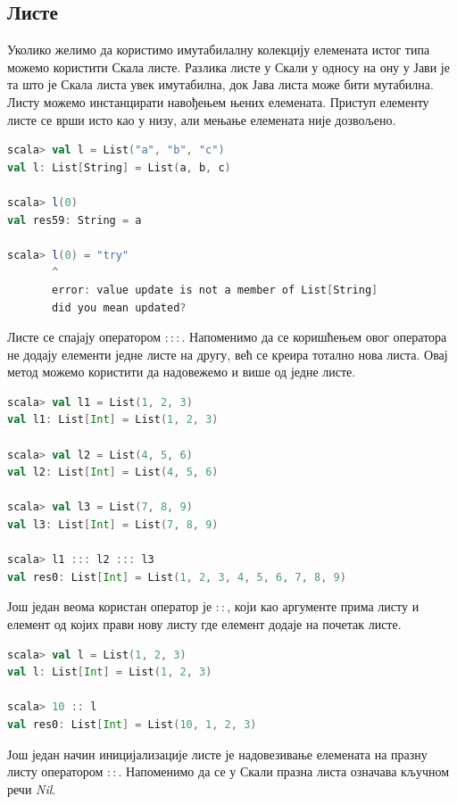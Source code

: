 \documentclass[12pt,oneside]{memoir}
\begin{document}
\subsection{Листе}
\label{subsec:scala_lists}

Уколико желимо да користимо имутабилалну колекцију елемената истог типа можемо користити Скала листе. Разлика листе у Скали у односу на ону у Јави је та што је Скала листа увек имутабилна, док Јава листа може бити мутабилна. Листу можемо инстанцирати навођењем њених елемената. Приступ елементу листе се врши исто као у низу, али мењање елемената није дозвољено. \cite{scala_prog}

\begin{lstlisting}[language=Scala]
scala> val l = List("a", "b", "c")
val l: List[String] = List(a, b, c)

scala> l(0)
val res59: String = a

scala> l(0) = "try"
       ^
       error: value update is not a member of List[String]
       did you mean updated?
\end{lstlisting}

Листе се спајају оператором $:::$. Напоменимо да се коришћењем овог оператора не додају елементи једне листе на другу, већ се креира тотално нова листа. Овај метод можемо користити да надовежемо и више од једне листе. \cite{scala_prog}

\begin{lstlisting}[language=Scala]
scala> val l1 = List(1, 2, 3)
val l1: List[Int] = List(1, 2, 3)

scala> val l2 = List(4, 5, 6)
val l2: List[Int] = List(4, 5, 6)

scala> val l3 = List(7, 8, 9)
val l3: List[Int] = List(7, 8, 9)

scala> l1 ::: l2 ::: l3
val res0: List[Int] = List(1, 2, 3, 4, 5, 6, 7, 8, 9)
\end{lstlisting}

Још један веома користан оператор је $::$, који као аргументе прима листу и елемент од којих прави нову листу где елемент додаје на почетак листе.

\begin{lstlisting}[language=Scala]
scala> val l = List(1, 2, 3)
val l: List[Int] = List(1, 2, 3)

scala> 10 :: l
val res0: List[Int] = List(10, 1, 2, 3)
\end{lstlisting}

Још један начин иницијализације листе је надовезивање елемената на празну листу оператором $::$. Напоменимо да се у Скали празна листа означава кључном речи \textit{Nil}.
\end{document}
